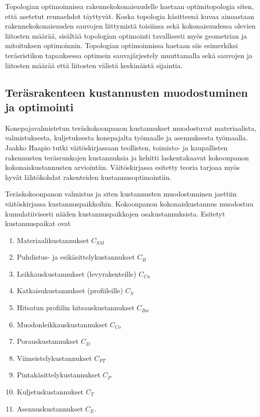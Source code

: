 \documentclass[12pt]{article}
\newenvironment{content}{\pagenumbering{arabic}}{}
\begin{document}
\begin{content}
Topologian optimoinnissa rakennekokonaisuudelle haetaan optimitopologia siten, että asetetut reunaehdot täyttyvät. Koska topologia käsitteenä kuvaa ainoastaan rakennekokonaisuuden sauvojen liittymistä toisiinsa sekä kokonaisuudessa olevien liitosten määrää, sisältää topologian optimointi tavallisesti myös geometrian ja mitoituksen optimoinnin. Topologian optimoinnissa haetaan siis esimerkiksi teräsristikon tapauksessa optimein sauvajärjestely muuttamalla sekä sauvojen ja liitosten määrää että liitosten välistä keskinäistä sijaintia. 

\subsection{Teräsrakenteen kustannusten muodostuminen ja optimointi}

Konepajavalmistetun teräskokoonpanon kustannukset muodostuvat materiaalista, valmistuksesta, kuljetuksesta konepajalta työmaalle ja asennuksesta työmaalla. Jaakko Haapio tutki väitöskirjassaan \parencite{haapio_doct} teollisten, toimisto- ja kaupallisten rakennusten teräsrunkojen kustannuksia ja kehitti laskentakaavat kokoonpanon kokonaiskustannusten arviointiin. Väitöskirjassa esitetty teoria tarjoaa myös hyvät lähtökohdat rakenteiden kustannusoptimointiin.

Teräskokoonpanon valmistus ja siten kustannusten muodostuminen jaettiin väitöskirjassa kustannuspaikkoihin. Kokoonpanon kokonaiskustannus muodostuu kumulatiivisesti näiden kustannuspaikkojen osakustannuksista. Esitetyt kustannuspaikat ovat

\begin{enumerate}
\item Materiaalikustannukset $C_{SM}$
\item Puhdistus- ja esikäsittelykustannukset $C_B$
\item Leikkauskustannukset (levyrakenteille) $C_{Cu}$
\item Katkaisukustannukset (profiileille) $C_S$
\item Hitsatun profiilin hitsauskustannukset $C_{Bw}$
\item Muodonleikkauskustannukset $C_{Co}$
\item Porauskustannukset $C_D$
\item Viimeistelykustannukset $C_{PT}$
\item Pintakäsittelykustannukset $C_P$
\item Kuljetuskustannukset $C_T$
\item Asennuskustannukset $C_E$.
\end{enumerate}


\end{content}
\end{document}
